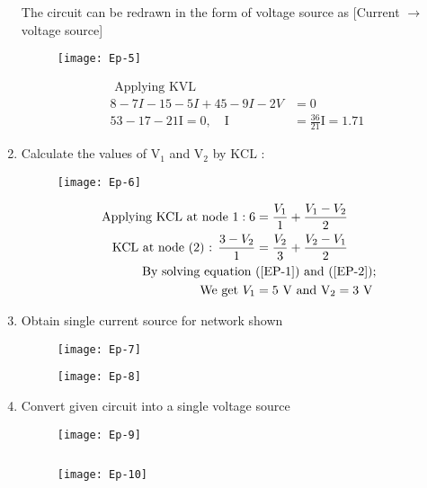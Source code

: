 \begin{enumerate}
\begin{answer}
		The circuit can be redrawn in the form of voltage source as [Current $\rightarrow$ voltage source]
			\begin{figure}[H]
			\centering
			\texttt{[image: Ep-5]}
		\end{figure}
		\begin{align*}
		\text { Applying KVL }\\
		8-7 I-15-5 I+45-9 I-2 V&=0\\
		53-17-21 \mathrm{I}=0, \quad \mathrm{I}&=\frac{36}{21} \mathrm{I}=1.71
		\end{align*}
	\end{answer}
	\item Calculate the values of $\mathrm{V}_{1}$ and $\mathrm{V}_{2}$ by $\mathrm{KCL}$ :
	\begin{figure}[H]
		\centering
		\texttt{[image: Ep-6]}
	\end{figure}
	\begin{answer}
		\begin{align}
		\text { Applying } \mathrm{KCL} \text { at node } 1: 6&=\frac{V_{1}}{1}+\frac{V_{1}-V_{2}}{2}\label{EP-1}\\
		\mathrm{KCL} \text { at node (2) : } \frac{3-V_{2}}{1}&=\frac{V_{2}}{3}+\frac{V_{2}-V_{1}}{2}\label{EP-2}\\
		\text { By solving equation  }&\text{(\ref{EP-1}) and (\ref{EP-2});}\notag\\
		\text { We get } V_{1}&=5 \mathrm{~V} \text { and } \mathrm{V}_{2}=3 \mathrm{~V}\notag
		\end{align}
	\end{answer}
	\item Obtain single current source for network shown
	\begin{figure}[H]
		\centering
		\texttt{[image: Ep-7]}
	\end{figure}
	\begin{answer}
	\begin{figure}[H]
		\centering
		\texttt{[image: Ep-8]}
	\end{figure}
	\end{answer}
	\item Convert given circuit into a single voltage source
	\begin{figure}[H]
		\centering
		\texttt{[image: Ep-9]}
	\end{figure}
	\begin{answer}$\left. \right. $\\
		\begin{figure}[H]
			\centering
			\texttt{[image: Ep-10]}
		\end{figure}
	\end{answer}
	
	
	
	
	
	
	
	
	
	
	
	
	
	
	
	
\end{enumerate}